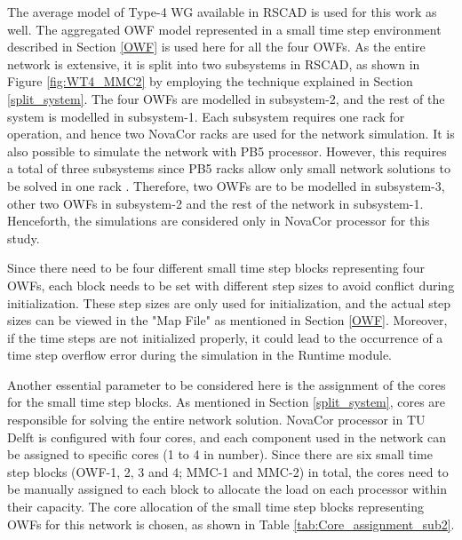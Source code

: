 The average model of Type-4 \gls{WG} available in RSCAD is used for this work as well. The aggregated \gls{OWF} model represented in a small time step environment described in Section \ref{OWF} is used here for all the four \gls{OWF}s. As the entire network is extensive, it is split into two subsystems in RSCAD, as shown in Figure \ref{fig:WT4_MMC2} by employing the technique explained in Section \ref{split_system}. The four \gls{OWF}s are modelled in subsystem-2, and the rest of the system is modelled in subsystem-1. Each subsystem requires one rack for operation, and hence two NovaCor racks are used for the network simulation. It is also possible to simulate the network with PB5 processor. However, this requires a total of three subsystems since PB5 racks allow only small network solutions to be solved in one rack \cite{noauthor_pb5_nodate_1}. Therefore, two \gls{OWF}s are to be modelled in subsystem-3, other two \gls{OWF}s in subsystem-2 and the rest of the network in subsystem-1. Henceforth, the simulations are considered only in NovaCor processor for this study.  


Since there need to be four different small time step blocks representing four \gls{OWF}s, each block needs to be set with different step sizes to avoid conflict during initialization. These step sizes are only used for initialization, and the actual step sizes can be viewed in the "Map File" as mentioned in Section \ref{OWF}. Moreover, if the time steps are not initialized properly, it could lead to the occurrence of a time step overflow error during the simulation in the Runtime module. 


Another essential parameter to be considered here is the assignment of the cores for the small time step blocks. As mentioned in Section \ref{split_system}, cores are responsible for solving the entire network solution. NovaCor processor in TU Delft is configured with four cores, and each component used in the network can be assigned to specific cores (1 to 4 in number). Since there are six small time step blocks (\gls{OWF}-1, 2, 3 and 4; \gls{MMC}-1 and \gls{MMC}-2) in total, the cores need to be manually assigned to each block to allocate the load on each processor within their capacity. The core allocation of the small time step blocks representing \gls{OWF}s for this network is chosen, as shown in Table \ref{tab:Core_assignment_sub2}.  

   

